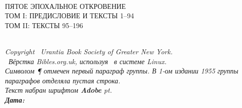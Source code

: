 \begin{center}
\bibcovertitlefont\urantiabook\\[3ex]
\LARGE ПЯТОЕ ЭПОХАЛЬНОЕ ОТКРОВЕНИЕ\\
\ifmultivol
\Large
\ifvoli ТОМ I: ПРЕДИСЛОВИЕ И ТЕКСТЫ 1--94\\\fi
\ifvolii ТОМ II: ТЕКСТЫ 95--196\\\fi
\fi
{}
\titlesepbig\\
\end{center}

\titleframe

\newpage

\begin{center}
\itshape
{}
Copyright \textcopyright\ Urantia Book Society of Greater New York.\\
\tux\ Вёрстка Bibles.org.uk, используя \XeLaTeX\ в системе Linux.\\
Символом {\upshape \P} отмечен первый параграф группы. В 1-ом издании 1955 группы параграфов отделяла пустая строка.\\
Текст набран шрифтом \textbf{Adobe \urantiamainfont} \urantiamainfontsize pt.\\[4pt]
\upshape\normalsize\bfseries Дата: \mytoday{}\\
\end{center}

\titleframe
